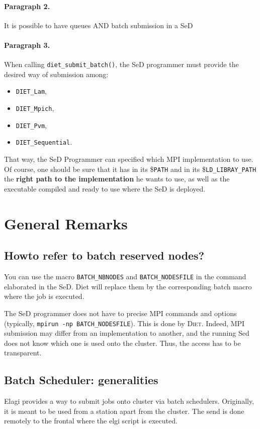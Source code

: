 \paragraph{Paragraph 2.}$ $\\
It is possible to have queues AND batch submission in a SeD

\paragraph{Paragraph 3.}$ $\\
When calling \verb$diet_submit_batch()$, the SeD programmer must provide the
desired way of submission among:

\begin{itemize}
\item \verb$DIET_Lam$,
\item \verb$DIET_Mpich$,
\item \verb$DIET_Pvm$,
\item \verb$DIET_Sequential$.
\end{itemize}

That way, the SeD Programmer can specified which MPI implementation to
use. Of course, one should be sure that it has in its \$\verb$PATH$ and
in its \$\verb$LD_LIBRAY_PATH$ the {\bf right path to the
implementation} he wants to use, as well as the executable compiled
and ready to use where the SeD is deployed.

\section{General Remarks}

\subsection{Howto refer to batch reserved nodes?}
You can use the macro \verb$BATCH_NBNODES$ and \verb$BATCH_NODESFILE$
in the command elaborated in the SeD. Diet will replace them by the
corresponding batch macro where the job is executed.

The SeD programmer does not have to precise MPI commands and options
(typically,
\verb$mpirun -np BATCH_NODESFILE$). This is done by \textsc{Diet}. Indeed,
MPI submission may differ from an implementation to another, and the
running Sed does not know which one is used onto the cluster. Thus,
the access has to be transparent.

\subsection{Batch Scheduler: generalities}
Elagi provides a way to submit jobs onto cluster via batch
schedulers. Originally, it is meant to be used from a station apart
from the cluster. The send is done remotely to the frontal where the
elgi script is executed.

